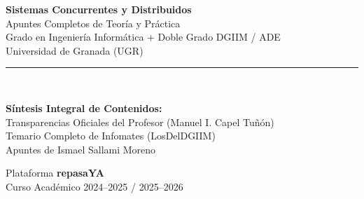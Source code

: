 \documentclass[11pt,a4paper,twoside,openright]{report}
\begin{document}
\begin{titlepage}
    \centering
    \vspace*{1.5cm}
    
    {\Huge\bfseries\color{scdDarkBlue}\textsf{Sistemas Concurrentes y Distribuidos}}\\[0.8cm]
    {\Large\textsf{Apuntes Completos de Teoría y Práctica}}\\[0.4cm]
    {\large\textsf{Grado en Ingeniería Informática + Doble Grado DGIIM / ADE}}\\[0.2cm]
    {\normalsize\textsf{Universidad de Granada (UGR)}}\\[1.5cm]
    
    \rule{0.8\textwidth}{1.5pt}\\[2.5cm]
    
    \begin{tcolorbox}[
        colback=scdLightAccent,
        colframe=scdAccent,
        width=0.85\textwidth,
        arc=4pt,
        halign=center
    ]
        \large\textbf{\color{scdDarkBlue}Síntesis Integral de Contenidos:}\\[6pt]
        \normalsize
        Transparencias Oficiales del Profesor (Manuel I. Capel Tuñón)\\[2pt]
        Temario Completo de Infomates (LosDelDGIIM)\\[2pt]
        Apuntes de Ismael Sallami Moreno
    \end{tcolorbox}
    
    \vfill
    
    {\large\textsf{Plataforma \textbf{repasaYA}}}\\[0.2cm]
    {\small\textsf{Curso Académico 2024--2025 / 2025--2026}}\\[0.8cm]
\end{titlepage}

\tableofcontents
\newpage






\end{document}
